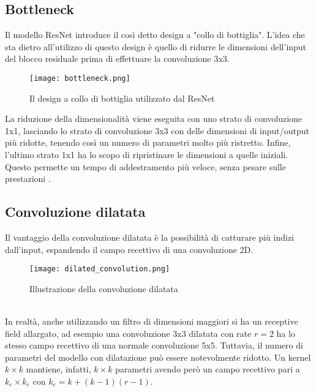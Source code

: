 \subsection{Bottleneck}
Il modello ResNet introduce il così detto design a "collo di bottiglia". L'idea che sta dietro all'utilizzo di questo design è quello di ridurre le dimensioni dell'input del blocco residuale prima di effettuare la convoluzione 3x3.
\begin{figure}[ht]
    \centering
    \texttt{[image: bottleneck.png]}
    \caption[Bottleneck]{Il design a collo di bottiglia utilizzato dal  ResNet}
\end{figure}
La riduzione della dimensionalità viene eseguita con uno strato di convoluzione 1x1, lasciando lo strato di convoluzione 3x3 con delle dimensioni di input/output più ridotte, tenendo così un numero di parametri molto più ristretto. Infine, l'ultimo strato 1x1 ha lo scopo di ripristinare le dimensioni a quelle iniziali. Questo permette un tempo di addestramento più veloce, senza pesare sulle prestazioni \cite{resnet}.

\subsection{Convoluzione dilatata}
Il vantaggio della convoluzione dilatata è la possibilità di catturare più indizi dall'input, espandendo il campo recettivo di una convoluzione 2D.
\begin{figure}[ht]
    \centering
    \texttt{[image: dilated\_convolution.png]}
    \caption[Convoluzione dilatata]{Illustrazione della convoluzione dilatata}
\end{figure}\\
In realtà, anche utilizzando un filtro di dimensioni maggiori si ha un receptive field allargato, ad esempio una convoluzione 3x3 dilatata con rate $r=2$ ha lo stesso campo recettivo di una normale convoluzione 5x5. Tuttavia, il numero di parametri del modello con dilatazione può essere notevolmente ridotto. Un kernel $k\times k$ mantiene, infatti, $k\times k$ parametri avendo però un campo recettivo pari a $k_e\times k_e$ con $k_e=k+(k-1)(r-1)$.

